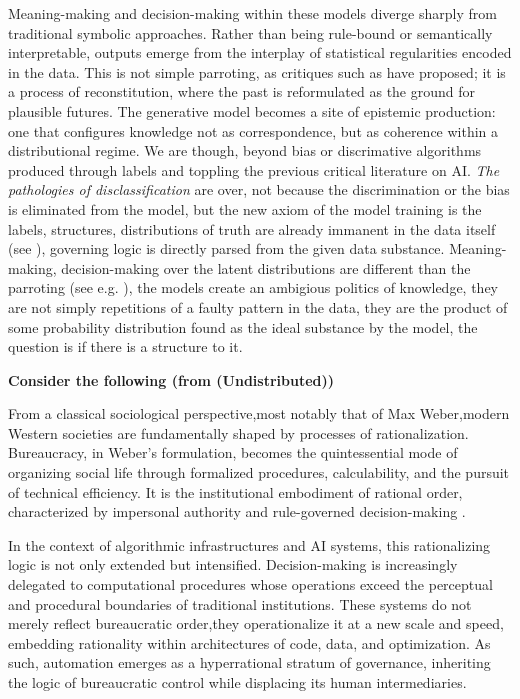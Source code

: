 Meaning-making and decision-making within these models diverge sharply from traditional symbolic approaches. Rather than being rule-bound or semantically interpretable, outputs emerge from the interplay of statistical regularities encoded in the data. This is not simple parroting, as critiques such as \textcite{bender2021b} have proposed; it is a process of reconstitution, where the past is reformulated as the ground for plausible futures. The generative model becomes a site of epistemic production: one that configures knowledge not as correspondence, but as coherence within a distributional regime. We are though, beyond bias or discrimative algorithms produced through labels and
toppling the previous critical literature on AI. \textit{The pathologies of
	disclassification} \parencite[3]{amoore2024} are over, not because the
discrimination or the bias is eliminated from the model, but the new axiom of
the model training is the labels, structures, distributions of truth are
already immanent in the data itself (see \cite[3]{amoore2024}), governing logic
is directly parsed from the given data substance. Meaning-making,
decision-making over the latent distributions are different than the parroting
(see e.g. \cite{bender2021b}), the models create an ambigious politics of
knowledge, they are not simply repetitions of a faulty pattern in the data,
they are the product of some probability distribution found as the ideal
substance by the model, the question is if there is a structure to it.


\begin{orangebox}
	\textbf{Consider the following (from (Undistributed))}

	From a classical sociological perspective,most notably that of Max Weber,modern Western societies are fundamentally shaped by processes of rationalization. Bureaucracy, in Weber’s formulation, becomes the quintessential mode of organizing social life through formalized procedures, calculability, and the pursuit of technical efficiency. It is the institutional embodiment of rational order, characterized by impersonal authority and rule-governed decision-making \parencite[46]{kivisto2013}.

	In the context of algorithmic infrastructures and AI systems, this rationalizing logic is not only extended but intensified. Decision-making is increasingly delegated to computational procedures whose operations exceed the perceptual and procedural boundaries of traditional institutions. These systems do not merely reflect bureaucratic order,they operationalize it at a new scale and speed, embedding rationality within architectures of code, data, and optimization. As such, automation emerges as a hyperrational stratum of governance, inheriting the logic of bureaucratic control while displacing its human intermediaries.
\end{orangebox}




